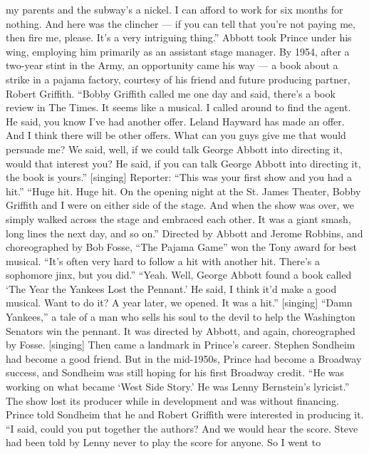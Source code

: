 \begin{itemize}
  my parents and the subway's a nickel. I can afford to work for six
  months for nothing. And here was the clincher --- if you can tell that
  you're not paying me, then fire me, please. It's a very intriguing
  thing.'' Abbott took Prince under his wing, employing him primarily as
  an assistant stage manager. By 1954, after a two-year stint in the
  Army, an opportunity came his way --- a book about a strike in a
  pajama factory, courtesy of his friend and future producing partner,
  Robert Griffith. ``Bobby Griffith called me one day and said, there's
  a book review in The Times. It seems like a musical. I called around
  to find the agent. He said, you know I've had another offer. Leland
  Hayward has made an offer. And I think there will be other offers.
  What can you guys give me that would persuade me? We said, well, if we
  could talk George Abbott into directing it, would that interest you?
  He said, if you can talk George Abbott into directing it, the book is
  yours.'' {[}singing{]} Reporter: ``This was your first show and you
  had a hit.'' ``Huge hit. Huge hit. On the opening night at the St.
  James Theater, Bobby Griffith and I were on either side of the stage.
  And when the show was over, we simply walked across the stage and
  embraced each other. It was a giant smash, long lines the next day,
  and so on.'' Directed by Abbott and Jerome Robbins, and choreographed
  by Bob Fosse, ``The Pajama Game'' won the Tony award for best musical.
  ``It's often very hard to follow a hit with another hit. There's a
  sophomore jinx, but you did.'' ``Yeah. Well, George Abbott found a
  book called `The Year the Yankees Lost the Pennant.' He said, I think
  it'd make a good musical. Want to do it? A year later, we opened. It
  was a hit.'' {[}singing{]} ``Damn Yankees,'' a tale of a man who sells
  his soul to the devil to help the Washington Senators win the pennant.
  It was directed by Abbott, and again, choreographed by Fosse.
  {[}singing{]} Then came a landmark in Prince's career. Stephen
  Sondheim had become a good friend. But in the mid-1950s, Prince had
  become a Broadway success, and Sondheim was still hoping for his first
  Broadway credit. ``He was working on what became `West Side Story.' He
  was Lenny Bernstein's lyricist.'' The show lost its producer while in
  development and was without financing. Prince told Sondheim that he
  and Robert Griffith were interested in producing it. ``I said, could
  you put together the authors? And we would hear the score. Steve had
  been told by Lenny never to play the score for anyone. So I went to

\end{itemize}
